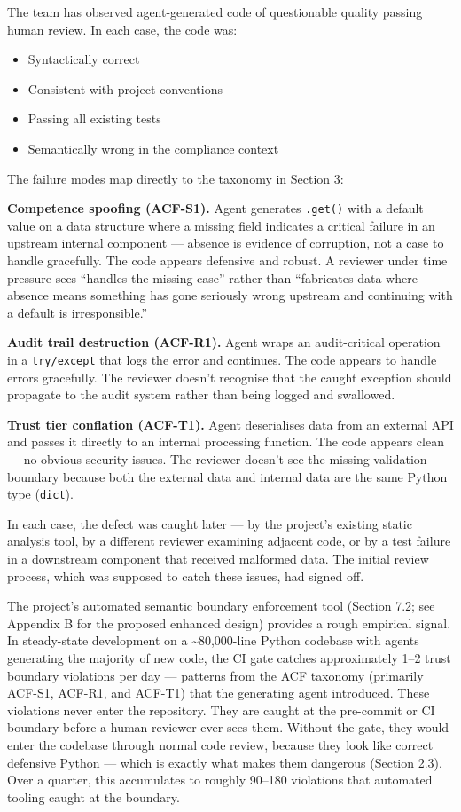 \documentclass[a4paper,11pt]{report}
\providecommand{\tightlist}{%
  \setlength{\itemsep}{0pt}\setlength{\parskip}{0pt}}
\begin{document}
The team has observed agent-generated code of questionable quality
passing human review. In each case, the code was:

\begin{itemize}
\tightlist
\item
  Syntactically correct
\item
  Consistent with project conventions
\item
  Passing all existing tests
\item
  Semantically wrong in the compliance context
\end{itemize}

The failure modes map directly to the taxonomy in Section 3:

\textbf{Competence spoofing (ACF-S1).} Agent generates \texttt{.get()}
with a default value on a data structure where a missing field indicates
a critical failure in an upstream internal component --- absence is
evidence of corruption, not a case to handle gracefully. The code
appears defensive and robust. A reviewer under time pressure sees
``handles the missing case'' rather than ``fabricates data where absence
means something has gone seriously wrong upstream and continuing with a
default is irresponsible.''

\textbf{Audit trail destruction (ACF-R1).} Agent wraps an audit-critical
operation in a \texttt{try/except} that logs the error and continues.
The code appears to handle errors gracefully. The reviewer doesn't
recognise that the caught exception should propagate to the audit system
rather than being logged and swallowed.

\textbf{Trust tier conflation (ACF-T1).} Agent deserialises data from an
external API and passes it directly to an internal processing function.
The code appears clean --- no obvious security issues. The reviewer
doesn't see the missing validation boundary because both the external
data and internal data are the same Python type (\texttt{dict}).

In each case, the defect was caught later --- by the project's existing
static analysis tool, by a different reviewer examining adjacent code,
or by a test failure in a downstream component that received malformed
data. The initial review process, which was supposed to catch these
issues, had signed off.

The project's automated semantic boundary enforcement tool (Section 7.2;
see Appendix B for the proposed enhanced design) provides a rough
empirical signal. In steady-state development on a
\textasciitilde80,000-line Python codebase with agents generating the
majority of new code, the CI gate catches approximately 1--2 trust
boundary violations per day --- patterns from the ACF taxonomy
(primarily ACF-S1, ACF-R1, and ACF-T1) that the generating agent
introduced. These violations never enter the repository. They are caught
at the pre-commit or CI boundary before a human reviewer ever sees them.
Without the gate, they would enter the codebase through normal code
review, because they look like correct defensive Python --- which is
exactly what makes them dangerous (Section 2.3). Over a quarter, this
accumulates to roughly 90--180 violations that automated tooling caught
at the boundary.
\end{document}
